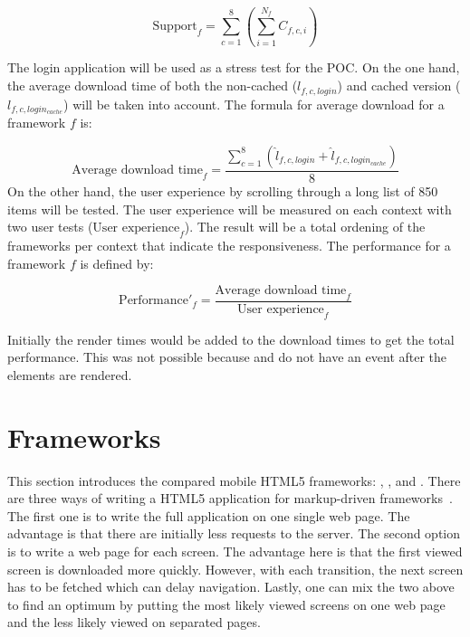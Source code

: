 \documentclass[a4paper]{artikel3}
\newcommand{\setspace}[0]{\vspace{2mm}}
\renewcommand{\paragraph}[1]{\setspace \noindent {\bf #1}  }
\begin{document}
\begin{equation}
  \text{Support}_f = \sum_{c=1}^{8}{\left(\sum\limits_{i=1}^{N_f}C_{f,c,i}\right)}
  \label{eq:ondersteuning}
\end{equation}

\paragraph{Performance}
The login application will be used as a stress test for the POC.
On the one hand, the average download time of both the non-cached ($l_{f,c,login}$) and cached version ($l_{f,c,login_{cache}}$) will be taken into account.
The formula for average download for a framework $f$ is:

\begin{equation*}
   \text{Average download time}_f= \frac{\sum_{c=1}^{8}{\left(\widehat{l}_{f,c,login}+\widehat{l}_{f,c,login_{cache}}\right)}}{8}
\end{equation*}
On the other hand, the user experience by scrolling through a long list of 850 items will be tested.
The user experience will be measured on each context with two user tests ($\text{User experience}_{f}$).
The result will be a total ordening of the frameworks per context that indicate the responsiveness.
The performance for a framework $f$ is defined by:

\begin{equation}
\text{Performance}'_f = \frac{\text{Average download time}_f}{\text{User experience}_f}
  \label{eq:performantie-enhanced}
\end{equation}

Initially the render times would be added to the download times to get the total performance.
This was not possible because \sta{} and \lungo{} do not have an event after the elements are rendered.


\section{Frameworks} %
\label{sec:frameworks}
This section introduces the compared mobile HTML5 frameworks: \st{}, \kendo{}, \jqm{} and \lungo{}.
There are three ways of writing a HTML5 application for markup-driven frameworks~\cite{Broulik2012}. 
The first one is to write the full application on one single web page.
The advantage is that there are initially less requests to the server.
The second option is to write a web page for each screen. 
The advantage here is that the first viewed screen is downloaded more quickly. 
However, with each transition, the next screen has to be fetched which can delay navigation.
Lastly, one can mix the two above to find an optimum by putting the most likely viewed screens on one web page and the less likely viewed on separated pages.  
\end{document}

